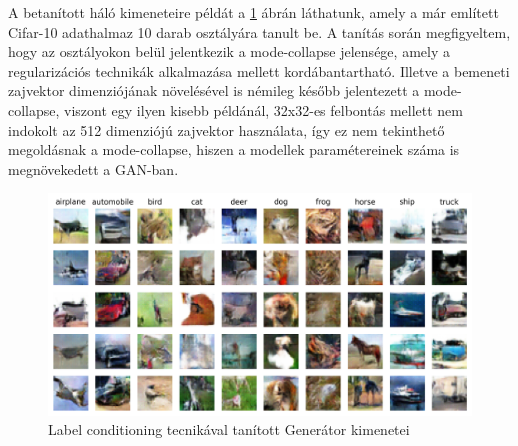 A betanított háló kimeneteire példát a \ref{fig:labelconditioning} ábrán láthatunk, amely a már említett Cifar-10 adathalmaz 10 darab osztályára tanult be. A tanítás során megfigyeltem, hogy az osztályokon belül jelentkezik a mode-collapse jelensége, amely a regularizációs technikák alkalmazása mellett kordábantartható. Illetve a bemeneti zajvektor dimenziójának növelésével is némileg később jelentezett a mode-collapse, viszont egy ilyen kisebb példánál, 32x32-es felbontás mellett nem indokolt az 512 dimenziójú zajvektor használata, így ez nem tekinthető megoldásnak a mode-collapse, hiszen a modellek paramétereinek száma is megnövekedett a GAN-ban.

\begin{figure}[h]
\centering
\includegraphics[width=13cm]{images/label_conditioning.png}
\caption{Label conditioning tecnikával tanított Generátor kimenetei}
\label{fig:labelconditioning}
\end{figure}